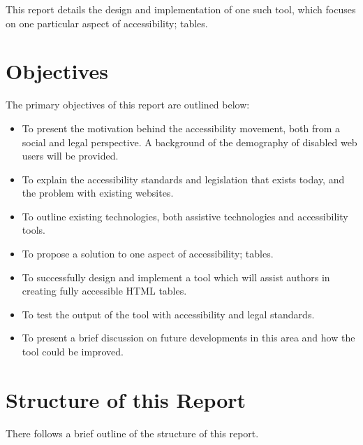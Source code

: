 This report details the design and implementation of one such tool, which 
focuses on one particular aspect of accessibility; tables. 

\section{Objectives}

The primary objectives of this report are outlined below:

\begin{itemize}

\item To present the motivation behind the accessibility movement, both from a
social and legal perspective. A background of the demography of disabled web users
will be provided.

\item To explain the accessibility standards and legislation that exists today,
and the problem with existing websites.

\item To outline existing technologies, both assistive technologies and 
accessibility tools.

\item To propose a solution to one aspect of accessibility; tables. 

\item To successfully design and implement a tool which will assist authors
in creating fully accessible HTML tables.

\item To test the output of the tool with accessibility and legal standards.

\item To present a brief discussion on future developments in this area and 
how the tool could be improved.

\end{itemize}

\section{Structure of this Report}

There follows a brief outline of the structure of this report.

